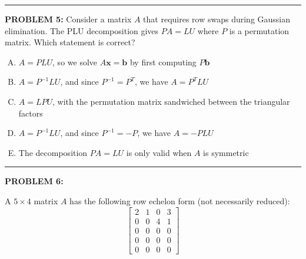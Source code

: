 \documentclass[12pt]{amsart}
\newcommand{\divider}{
  \vspace{-1em} %
  \noindent
  \raisebox{-0.15ex}{\textbullet}%
  \hspace{0.5em}%
  \rule[0.5ex]{0.95\textwidth}{1.0pt}%
  \hspace{0.5em}%
  \raisebox{-0.15ex}{\textbullet}%
  \vspace{0em} %
}
\begin{document}
\divider

{\bf PROBLEM 5:}
Consider a matrix $A$ that requires row swaps during Gaussian elimination. The PLU decomposition gives $PA = LU$ where $P$ is a permutation matrix. Which statement is correct?

\begin{enumerate}[(A)]
\item $A = PLU$, so we solve $A\mathbf{x} = \mathbf{b}$ by first computing $P\mathbf{b}$
\item $A = P^{-1}LU$, and since $P^{-1} = P^T$, we have $A = P^TLU$
\item $A = LPU$, with the permutation matrix sandwiched between the triangular factors
\item $A = P^{-1}LU$, and since $P^{-1} = -P$, we have $A = -PLU$
\item The decomposition $PA = LU$ is only valid when $A$ is symmetric
\end{enumerate}


\divider

{\bf PROBLEM 6:}

A $5 \times 4$ matrix $A$ has the following row echelon form (not necessarily reduced):
$$\begin{bmatrix} 2 & 1 & 0 & 3 \\ 0 & 0 & 4 & 1 \\ 0 & 0 & 0 & 0 \\ 0 & 0 & 0 & 0 \\ 0 & 0 & 0 & 0 \end{bmatrix}$$
\end{document}
